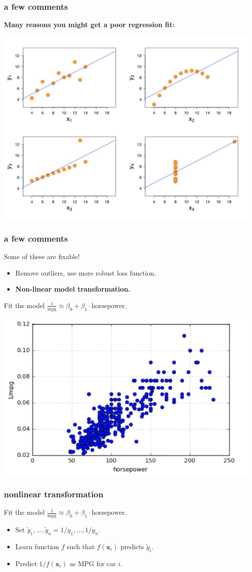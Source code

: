 \documentclass[handout,compress]{beamer}
\newcommand{\bv}[1]{\mathbf{#1}}
\begin{document}
\begin{frame}[t]
	\frametitle{a few comments}
	\textbf{Many reasons you might get a poor regression fit:}
	\begin{center}
		\includegraphics[width=.7\textwidth]{poor_fit.png}
	\end{center}
\end{frame}

\begin{frame}[t]
	\frametitle{a few comments}
	Some of these are fixable!
	\begin{itemize}
		\item Remove outliers, use more robust loss function.
		\item \alert{\textbf{Non-linear model transformation.}}
	\end{itemize}
	Fit the model $\frac{1}{\text{mpg}} \approx \beta_0 + \beta_1\cdot \text{horsepower}$.
	
	\begin{center}
		\includegraphics[width=.45\textwidth]{oneovermpg.png}	
	\end{center}
\end{frame}

\begin{frame}[t]
	\frametitle{nonlinear transformation}
	Fit the model $\frac{1}{\text{mpg}} \approx \beta_0 + \beta_1\cdot \text{horsepower}$.

	\begin{itemize}
		\item Set $\tilde{y}_1, \ldots, \tilde{y}_n = 1/y_1, \ldots, 1/y_n$.
		\item Learn function $f$ such that $f(\bv{x}_i)$ predicts $\tilde{y}_i$.
		\item Predict $1/f(\bv{x}_i)$ as MPG for car $i$. 
	\end{itemize}
\end{frame}
\end{document}
